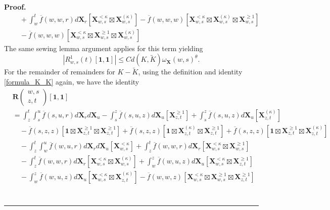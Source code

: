 \documentclass{article}%
\newenvironment{proof}[1][Proof]{\noindent\textbf{#1.} }{\ \rule{0.5em}{0.5em}}
\begin{document}
\begin{proof}
\begin{align*}
    & \quad  
    + \int_w^t \overline f(w,w,r) d\mathbf{X}_r \left[\mathbf{X}_{w,s}^{< \kappa }\boxtimes \mathbf{X}^{(\kappa)}_{w,s}\right] - \overline f(w,w,w)\left[ \mathbf{X}^{< \kappa}_{w,s} \boxtimes \mathbf{X}^{(\kappa)}_{w,s} \boxtimes \mathbf{X}^{\ge 1}_{w,s} \right]\\
    &\quad - \overline f(w,w,w)\left[ \mathbf{X}^{< \kappa}_{w,s} \boxtimes \mathbf{X}^{\ge 1}_{w,s}\boxtimes \mathbf{X}^{(\kappa)}_{w,s}  \right]
\end{align*}
The same sewing lemma argument applies for this term yielding 
\[
\left|R^{1}_{w,s}(t)[\mathbf{1}, \mathbf{1}] \right| \leq C d(K, \tilde{K})\omega_{\mathbf{X}}(w,s)^{\theta}.
\]
For the remainder of remainders for $K - \tilde{K}$, using the definition and identity \eqref{formula_K_K} again, we have the identity
\begin{align*}
& \mathbf{R} \begin{pmatrix} w,s \\ z,t \end{pmatrix}[\mathbf{1}, \mathbf{1}]\\
&= \int_z^t \int_s^u \overline f(s,u,r) d\mathbf{X}_r d\mathbf{X}_u - \int_s^z \overline f(s,u,z) d\mathbf{X}_u \left[\mathbf{X}^{\ge 1}_{z,t}\right] + \int_s^z \overline f(s,u,z) d\mathbf{X}_u \left[\mathbf{X}^{(\kappa)}_{z,t}\right]\\
& \quad - \overline f(s,z,z) \left[\mathbf{1} \boxtimes \mathbf{X}^{\geq 1}_{z,t} \boxtimes \mathbf{X}^{\geq 1}_{z,t}\right] + \overline f(s,z,z) \left[\mathbf{1} \boxtimes \mathbf{X}^{(\kappa)}_{z,t} \boxtimes \mathbf{X}^{\geq 1}_{z,t}\right] + \overline f(s,z,z) \left[\mathbf{1} \boxtimes \mathbf{X}^{\geq 1}_{z,t} \boxtimes \mathbf{X}^{(\kappa)}_{z,t}\right]\\
& \quad - \int_z^t \int_w^u \overline f(w,u,r) d\mathbf{X}_r d\mathbf{X}_u \left[\mathbf{X}^{< \kappa}_{w,s}\right] 
+ \int_z^t  \overline f(w,w,r) d\mathbf{X}_r  \left[\mathbf{X}^{< \kappa}_{w,s} \boxtimes \mathbf{X}^{\geq 1}_{w,s}\right]\\
&\quad -\int_z^t  \overline f(w,w,r) d\mathbf{X}_r  \left[\mathbf{X}^{< \kappa}_{w,s} \boxtimes \mathbf{X}^{(\kappa)}_{w,s}\right] + \int_w^z \overline f(w,u,z) d\mathbf{X}_u [ \mathbf{X}^{< \kappa}_{w,s} \boxtimes \mathbf{X}^{\ge 1}_{z,t}]\\
&\quad 
- \int_w^z \overline f(w,u,z) d\mathbf{X}_u [ \mathbf{X}^{< \kappa}_{w,s} \boxtimes \mathbf{X}^{(\kappa)}_{z,t}]
- \overline{f}(w,w,z)\left[ \mathbf{X}^{< \kappa}_{w,s} \boxtimes \mathbf{X}^{\ge 1}_{w,s} \boxtimes \mathbf{X}^{\ge 1}_{z,t}\right]\\

\end{align*}
\end{proof}
\end{document}
